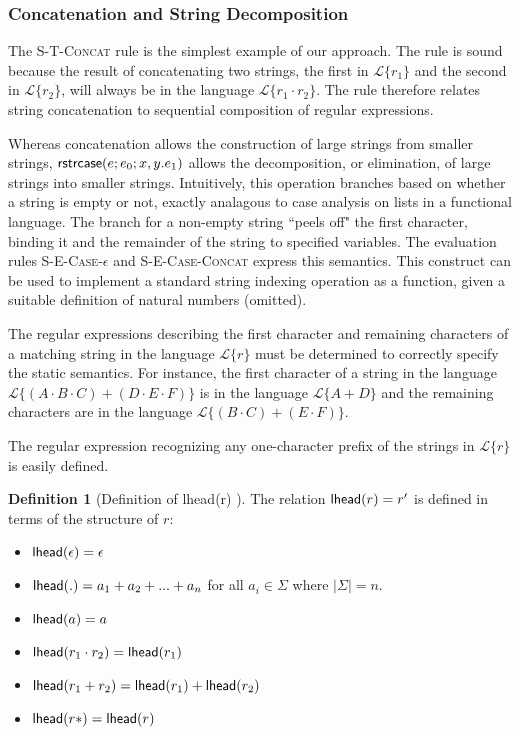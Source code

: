 \documentclass[9pt]{sig-alternate}
\theoremstyle{definition}
\newtheorem{defn}[thm]{Definition}
\newcommand{\Lagr}{\mathcal{L}}
\newcommand{\lang}[1]{\Lagr\{#1\}}
\newcommand{\strcase}[3]{ {\sf rstrcase}(#1; #2; #3)}
\newcommand{\lhead}[1]{ {\sf lhead}(#1) }
\begin{document}
\subsubsection{Concatenation and String Decomposition}

The \textsc{S-T-Concat} rule is the simplest example of our approach. The rule is sound because the result of concatenating two strings, the first in $\lang{r_1}$ and the second in $\lang{r_2}$, will always be in the language $\lang{r_1\cdot r_2}$. The rule therefore relates string concatenation to sequential composition of regular expressions.

Whereas concatenation allows the construction of large strings from smaller strings,  $\strcase{e}{e_0}{x,y.e_1}$  allows the decomposition, or elimination, of large strings into smaller strings. Intuitively, this operation branches based on whether a string is empty or not, exactly analagous to case analysis on lists in a functional language. The branch for a non-empty string ``peels off" the first character, binding it and the remainder of the string to specified variables. The evaluation rules \textsc{S-E-Case-$\epsilon$} and \textsc{S-E-Case-Concat} express this semantics. This construct can be used to implement a standard string indexing operation as a function, given a suitable definition of natural numbers (omitted).

The regular expressions describing the first character and remaining characters of a matching string in the language $\lang{r}$ must be determined to correctly specify the static semantics. For instance, the first character of a string in the language $\lang{(A\cdot B\cdot C)+(D\cdot E\cdot F)}$ is in the language $\lang{A+D}$ and the remaining characters are in the language $\lang{(B\cdot C)+(E \cdot F)}$. 


The regular expression recognizing any one-character prefix of the strings in $\lang{r}$ is easily defined.

\begin{defn}[Definition of \lhead{r}]
The relation $\lhead{r}=r'$ is defined in terms of the structure of $r$:
\begin{itemize}[noitemsep]
\item $\lhead{\epsilon} = \epsilon$
\item $\lhead{.} = a_1 + a_2 + ... + a_n$ for all $a_i \in \Sigma$ where $|\Sigma| = n$.
\item $\lhead{a} = a$ %
\item $\lhead{r_1\cdot r_2} = \lhead{r_1}$
\item $\lhead{r_1 +  r_2}  = \lhead{r_1} + \lhead{r_2}$
\item $\lhead{r*} = \lhead{r}$
\end{itemize}
\end{defn}
\end{document}
